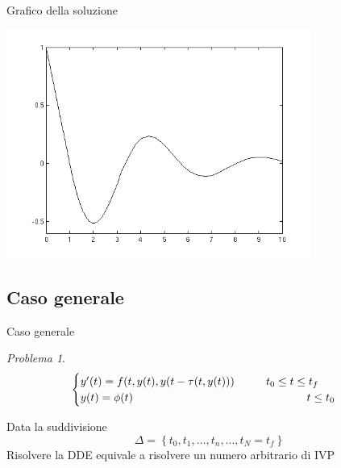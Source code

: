 \documentclass[intlimits]{beamer}
\numberwithin{equation}{section}
\theoremstyle{plain}
\theoremstyle{definition}
\theoremstyle{remark}
\newtheorem{prob}[teor]{Problema}
\begin{document}
\begin{frame}{Grafico della soluzione}
 
\includegraphics[width=10cm]{immagini/immagine6.png}


\end{frame}



\subsection{Caso generale}

\begin{frame}{Caso generale}
\pause
\begin{prob}
$$
\begin{cases}
 y'(t) = f(t,y(t),y(t- \tau (t,y(t)))	\hspace{1cm}	t_0 \le t \le t_f \\
 y(t)=\phi(t)				\hspace{5.5cm}	t \le t_0
\end{cases}
$$
\end{prob}
\pause
Data la suddivisione 
$$
\Delta= \left \{ t_0, t_1, \dots , t_n , \dots , t_N = t_f \right \}
$$
\pause
Risolvere la DDE equivale a risolvere un numero arbitrario di IVP
\end{frame}
\end{document}
